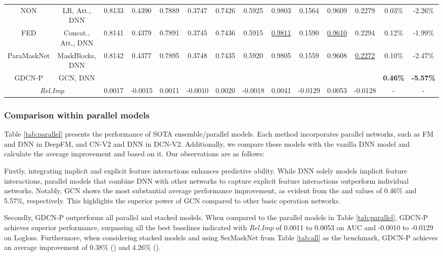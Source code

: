 \documentclass[sigconf]{acmart}
\begin{document}
\begin{table*}
{\begin{tabular}{cc|cc|cc|cc|cc|cc|cc}
\hline
NON&LR, Att., DNN  & 0.8133 & 0.4390 & 0.7889 & 0.3747&0.7426 & 0.5925 & 0.9803 & 0.1564 &0.9609	&0.2279 &  0.03\%	&-2.26\%  \\
FED&Concat., Att.,  DNN & 0.8141 & 0.4379 & 0.7891 & 0.3745&0.7436 & 0.5915&\underline{0.9811} & 0.1590 & \underline{0.9610} & 0.2294 & 0.12\%	&-1.99\%  \\ 
ParaMaskNet&MaskBlocks, DNN &0.8142&0.4377  &0.7895 & 0.3748  &0.7435& 0.5920  &0.9805 &0.1559   &0.9608 &\underline{0.2272}   &0.10\% 	&-2.47\%\\
\hline
GDCN-P&GCN, DNN & &  &  && && &  &  &  &  \textbf{0.46\%}	&\textbf{-5.57\%}  \\
\multicolumn{2}{c|}{\textit{Rel.Imp}}  & 0.0017 & -0.0015 & 0.0011 & -0.0010 &0.0020&-0.0018& 0.0041 & -0.0129 & 0.0053 & -0.0128 &- & -\\


\hline
\bottomrule
\end{tabular}
}
\end{table*}

\subsubsection{Comparison within parallel models}
Table \ref{tab:parallel} presents the performance of SOTA ensemble/parallel models. Each method incorporates parallel networks, such as FM and DNN in DeepFM, and CN-V2 and DNN in DCN-V2. Additionally, we compare these models with the vanilla DNN model and calculate the average improvement  and  based on it. Our observations are as follows:

Firstly, integrating implicit and explicit feature interactions enhances predictive ability. While DNN solely models implicit feature interactions, parallel models that combine DNN with other networks to capture explicit feature interactions outperform individual networks. Notably, GCN shows the most substantial average performance improvement, as evident from the  and  values of 0.46\% and 5.57\%, respectively. This highlights the superior power of GCN compared to other basic operation networks.
 

Secondly, GDCN-P outperforms all parallel and stacked models. When compared to the parallel models in Table \ref{tab:parallel}, GDCN-P achieves superior performance, surpassing all the best baselines indicated with \textit{Rel.Imp} of 0.0011 to 0.0053 on AUC and -0.0010 to -0.0129 on Logloss. Furthermore, when considering stacked models and using SerMaskNet from Table \ref{tab:all} as the benchmark, GDCN-P achieves an average improvement of 0.38\% () and 4.26\% ().
\end{document}

